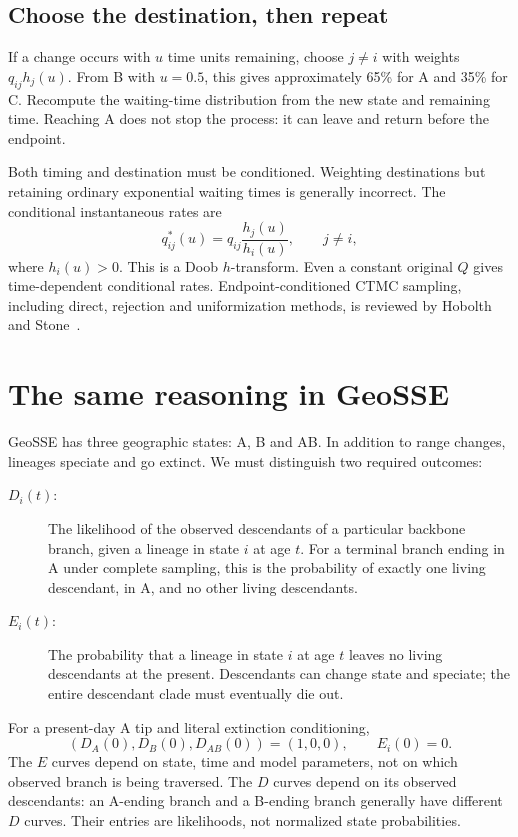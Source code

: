 \documentclass[11pt,a4paper]{article}
\begin{document}
\subsection{Choose the destination, then repeat}
If a change occurs with \(u\) time units remaining, choose \(j\ne i\) with
weights \(q_{ij}h_j(u)\). From B with \(u=0.5\), this gives approximately
65\% for A and 35\% for C. Recompute the waiting-time distribution from the
new state and remaining time. Reaching A does not stop the process: it can
leave and return before the endpoint.

Both timing and destination must be conditioned. Weighting destinations but
retaining ordinary exponential waiting times is generally incorrect. The
conditional instantaneous rates are
\[
q^*_{ij}(u)=q_{ij}\frac{h_j(u)}{h_i(u)},\qquad j\ne i,
\]
where \(h_i(u)>0\). This is a Doob \(h\)-transform. Even a constant original
\(Q\) gives time-dependent conditional rates. Endpoint-conditioned CTMC sampling,
including direct, rejection and uniformization methods, is reviewed by
Hobolth and Stone~\cite{hobolth}.

\newpage
\section{The same reasoning in GeoSSE}
GeoSSE has three geographic states: A, B and AB. In addition to range changes,
lineages speciate and go extinct. We must distinguish two required outcomes:
\begin{description}
\item[\(D_i(t)\):] The likelihood of the observed descendants of a particular
backbone branch, given a lineage in state \(i\) at age \(t\).
For a terminal branch ending in A under complete sampling, this is the probability
of exactly one living descendant, in A, and no other living descendants.
\item[\(E_i(t)\):] The probability that a lineage in state \(i\) at age \(t\)
leaves no living descendants at the present. Descendants can change state and
speciate; the entire descendant clade must eventually die out.
\end{description}
For a present-day A tip and literal extinction conditioning,
\[
(D_A(0),D_B(0),D_{AB}(0))=(1,0,0),\qquad E_i(0)=0.
\]
The \(E\) curves depend on state, time and model parameters, not on which
observed branch is being traversed. The \(D\) curves depend on its observed
descendants: an A-ending branch and a B-ending branch generally have different
\(D\) curves. Their entries are likelihoods, not normalized state probabilities.
\end{document}
